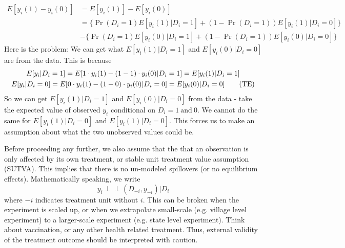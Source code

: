 \documentclass[12pt]{article}
\theoremstyle{definition}
\theoremstyle{property}
\theoremstyle{assumption}
\theoremstyle{example}
\theoremstyle{comment}
\begin{document}
\begin{align*}
E[y_i(1)-y_i(0)] & = E[y_i(1)]-E[y_i(0)]\\
&=\{\Pr(D_i=1)E[y_i(1)|D_i=1]+(1-\Pr(D_i=1))E[y_i(1)|D_i=0]\}\\
&-\{\Pr(D_i=1)E[y_i(0)|D_i=1]+(1-\Pr(D_i=1))E[y_i(0)|D_i=0]\}
\end{align*}
Here is the problem: We can get what $E[y_i(1)|D_i=1]$ and $E[y_i(0)|D_i=0]$ are from the data. This is because 
\begin{gather*}
E[y_i|D_i=1]=E[1\cdot y_i(1)-(1-1)\cdot y_i(0)|D_i=1]=E[y_i(1)|D_i=1]\\
E[y_i|D_i=0]=E[0\cdot y_i(1)-(1-0)\cdot y_i(0)|D_i=0]=E[y_i(0)|D_i=0] \tag{\text{TE}}\label{TE}
\end{gather*}
So we can get $E[y_i(1)|D_i=1]$ and $E[y_i(0)|D_i=0]$ from the data - take the expected value of observed $y_i$ conditional on $D_i=1 \ \text{and}\ 0$. We cannot do the same for $E[y_i(1)|D_i=0]$ and $E[y_i(1)|D_i=0]$. This forces us to make an assumption about what the two unobserved values could be. \par
Before proceeding any further, we also assume that the that an observation is only affected by its own treatment, or stable unit treatment value assumption (SUTVA). This implies that there is no un-modeled spillovers (or no equilibrium effects).  Mathematically speaking, we write
\[
y_i\perp \!\!\! \perp (D_{-i}, y_{-i}) \vert D_i
\]
where $-i$ indicates treatment unit without $i$. This can be broken when the experiment is scaled up, or when we extrapolate small-scale (e.g. village level experiment) to a larger-scale experiment (e.g. state level experiment). Think about vaccination, or any other health related treatment. Thus, external validity of the treatment outcome should be interpreted with caution. 
\end{document}
